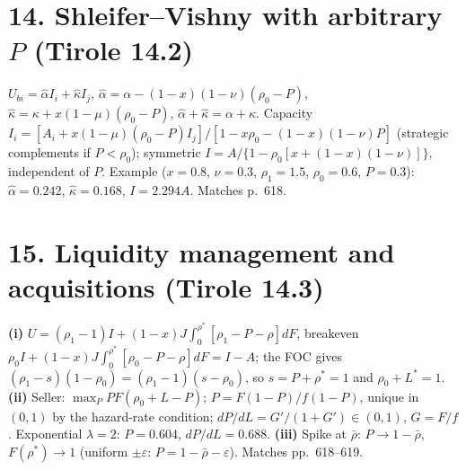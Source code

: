 \documentclass[11pt,a4paper]{article}
\begin{document}
\section*{14. Shleifer--Vishny with arbitrary $P$ (Tirole 14.2)}
$U_{bi}=\hat\alpha I_i+\hat\kappa I_j$, $\hat\alpha=\alpha-(1-x)(1-\nu)(\rho_0-P)$, $\hat\kappa=\kappa+x(1-\mu)(\rho_0-P)$,
$\hat\alpha+\hat\kappa=\alpha+\kappa$. Capacity $I_i=[A_i+x(1-\mu)(\rho_0-P)I_j]/[1-x\rho_0-(1-x)(1-\nu)P]$
(strategic complements if $P<\rho_0$); symmetric $I=A/\{1-\rho_0[x+(1-x)(1-\nu)]\}$, independent of $P$.
Example ($x=0.8$, $\nu=0.3$, $\rho_1=1.5$, $\rho_0=0.6$, $P=0.3$): $\hat\alpha=0.242$, $\hat\kappa=0.168$, $I=2.294A$. Matches p.~618.

\section*{15. Liquidity management and acquisitions (Tirole 14.3)}
\textbf{(i)} $U=(\rho_1-1)I+(1-x)J\int_0^{\rho^*}[\rho_1-P-\rho]dF$, breakeven
$\rho_0I+(1-x)J\int_0^{\rho^*}[\rho_0-P-\rho]dF=I-A$; the FOC gives $(\rho_1-s)(1-\rho_0)=(\rho_1-1)(s-\rho_0)$, so
$s=P+\rho^*=1$ and $\rho_0+L^*=1$.
\textbf{(ii)} Seller: $\max_P PF(\rho_0+L-P)$; $P=F(1-P)/f(1-P)$, unique in $(0,1)$ by the hazard-rate condition;
$dP/dL=G'/(1+G')\in(0,1)$, $G=F/f$. Exponential $\lambda=2$: $P=0.604$, $dP/dL=0.688$.
\textbf{(iii)} Spike at $\bar\rho$: $P\to1-\bar\rho$, $F(\rho^*)\to1$ (uniform $\pm\varepsilon$: $P=1-\bar\rho-\varepsilon$). Matches pp.~618--619.
\end{document}
